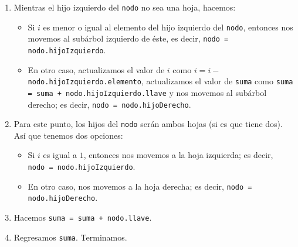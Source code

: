 \documentclass[letterpaper,11pt]{article}
\begin{document}
\begin{enumerate}
\begin{itemize}
\begin{enumerate}
            \item Mientras el hijo izquierdo del \texttt{nodo} no sea una 
            hoja, hacemos:
            \begin{itemize}
                \item Si $i$ es menor o igual al elemento del hijo izquierdo 
                del \texttt{nodo}, entonces nos movemos al subárbol izquierdo 
                de éste, es decir, \texttt{nodo = nodo.hijoIzquierdo}.

                \item En otro caso, actualizamos el valor de $i$ como 
                $i = i -$ \texttt{nodo.hijoIzquierdo.elemento}, actualizamos 
                el valor de \texttt{suma} como 
                \texttt{suma = suma + nodo.hijoIzquierdo.llave} y nos movemos 
                al subárbol derecho; es decir, \texttt{nodo = nodo.hijoDerecho}.
            \end{itemize}

            \item Para este punto, los hijos del \texttt{nodo} serán ambos 
            hojas (si es que tiene dos). Así que tenemos dos opciones:
            \begin{itemize}
                \item Si $i$ es igual a $1$, entonces nos movemos a la 
                hoja izquierda; es decir, \\ 
                \texttt{nodo = nodo.hijoIzquierdo}.

                \item En otro caso, nos movemos a la hoja derecha; es decir, 
                \texttt{nodo = nodo.hijoDerecho}.
            \end{itemize}

            \item Hacemos \texttt{suma = suma + nodo.llave}. 
            
            \item Regresamos \texttt{suma}. Terminamos.
        \end{enumerate}


\end{itemize}
\end{enumerate}
\end{document}
